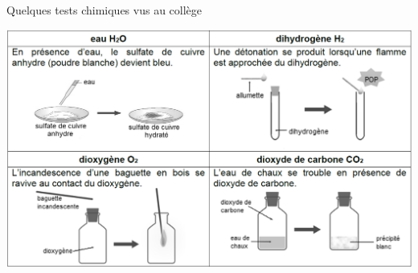 \begin{doc}{Quelques tests chimiques vus au collège}
    \begin{center}
        \includegraphics[scale=0.46]{Images/TP1/Tests_chimiques.png}
    \end{center}
\end{doc}

